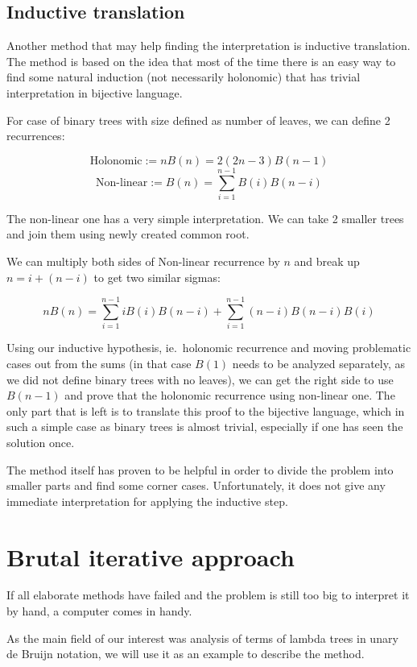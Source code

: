 \documentclass[final]{article}
\theoremstyle{definition}
\theoremstyle{remark}
\begin{document}
\subsection{Inductive translation}%
\label{sub:inductive_translation}

Another method that may help finding the interpretation is inductive translation\cite{doron}. The method is based on the idea that most of the time there is an easy way to find some natural induction (not necessarily holonomic) that has trivial interpretation in bijective language.

For case of binary trees with size defined as number of leaves, we can define 2 recurrences:

\[\text{Holonomic} := nB(n) = 2 (2n - 3)B(n - 1)\]
\[\text{Non-linear} := B(n) = \sum_{i=1}^{n - 1} B(i) B(n - i)\]

The non-linear one has a very simple interpretation. We can take 2 smaller trees and join them using newly created common root.

We can multiply both sides of Non-linear recurrence by \(n\) and break up \(n = i + (n - i)\) to get two similar sigmas:

\[n B(n) = \sum_{i=1}^{n - 1} i B(i) B(n - i) + \sum_{i=1}^{n - 1} (n - i) B(n - i) B(i)\]

Using our inductive hypothesis, ie.\ holonomic recurrence and moving problematic cases out from the sums (in that case \(B(1)\) needs to be analyzed separately, as we did not define binary trees with no leaves), we can get the right side to use \(B(n - 1)\) and prove that the holonomic recurrence using non-linear one. The only part that is left is to translate this proof to the bijective language, which in such a simple case as binary trees is almost trivial, especially if one has seen the solution once.

The method itself has proven to be helpful in order to divide the problem into smaller parts and find some corner cases. Unfortunately, it does not give any immediate interpretation for applying the inductive step.

\section{Brutal iterative approach}%
\label{sec:brutal_iterative_approach}

If all elaborate methods have failed and the problem is still too big to interpret it by hand, a computer comes in handy.

As the main field of our interest was analysis of terms of lambda trees in unary de Bruijn notation, we will use it as an example to describe the method.
\end{document}

